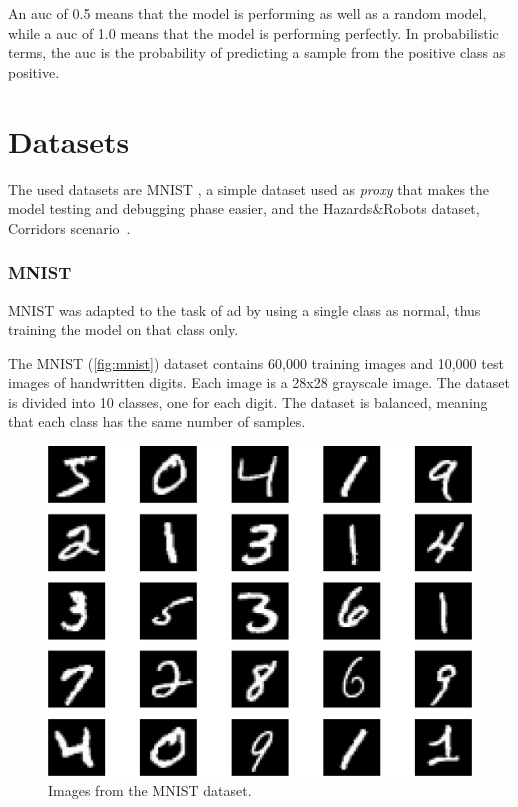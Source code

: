     An \acrshort{auc} of 0.5 means that the model is performing as well as a random model, while a \acrshort{auc} of 1.0 means that the model is performing perfectly.
    In probabilistic terms, the \acrshort{auc} is the probability of predicting a sample from the positive class as positive.


\section{Datasets}
    The used datasets are MNIST \cite{lecun1998mnist}, a simple dataset used as \emph{proxy} that makes the model testing and debugging phase easier, and the Hazards\&Robots dataset, Corridors scenario~\cite{mantegazza2022outlier}.

    \subsubsection{MNIST}
     
        MNIST was adapted to the task of \acrshort{ad} by using a single class as normal, thus training the model on that class only.

    The MNIST (\autoref{fig:mnist}) dataset contains 60,000 training images and 10,000 test images of handwritten digits. Each image is a 28x28 grayscale image. The dataset is divided into 10 classes, one for each digit. The dataset is balanced, meaning that each class has the same number of samples.
    \begin{figure}[H]
        \centering
        \centerline{\includegraphics[width=\textwidth]{img/mnist_numbers.png}}
        \caption{Images from the MNIST dataset.}
        \label{fig:mnist}
    \end{figure}

